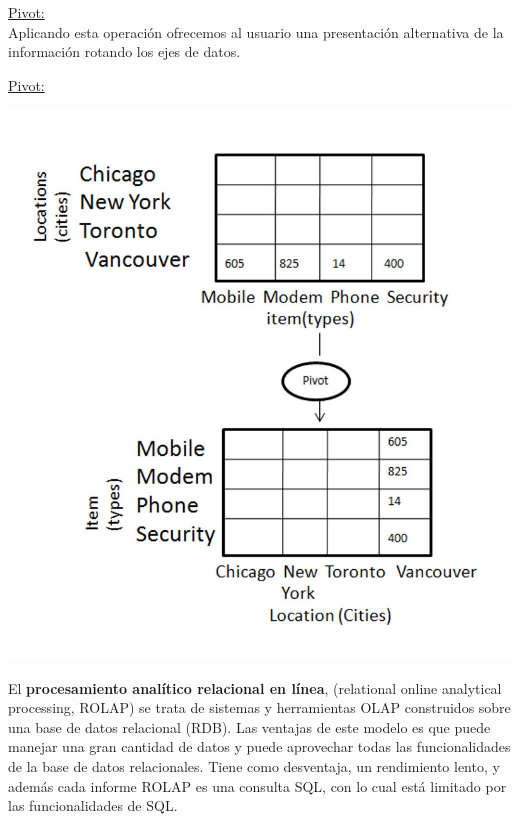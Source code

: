 \documentclass{fancyslides}
\begin{document}
\begin{frame}
\misc
{
  \underline{Pivot:}\\
Aplicando esta operación ofrecemos al usuario una presentación alternativa de la información rotando los ejes de datos.
}
\end{frame}

\begin{frame}
\misc
{
  \underline{Pivot:}
  \begin{center}
  \includegraphics[scale=0.3]{pivot}
  \end{center}
}
\end{frame}

\begin{frame}
\end{frame}

\begin{frame}
\misc
{
 El \textbf{procesamiento analítico relacional en línea}, (relational online analytical processing, ROLAP) se trata de sistemas y herramientas OLAP construidos sobre una base de datos relacional (RDB). Las ventajas de este modelo es que puede manejar una gran cantidad de datos y puede aprovechar todas las funcionalidades de la base de datos relacionales. Tiene como desventaja, un rendimiento lento, y además cada informe ROLAP es una consulta SQL, con lo cual está limitado por las funcionalidades de SQL.
}
\end{frame}
\end{document}
